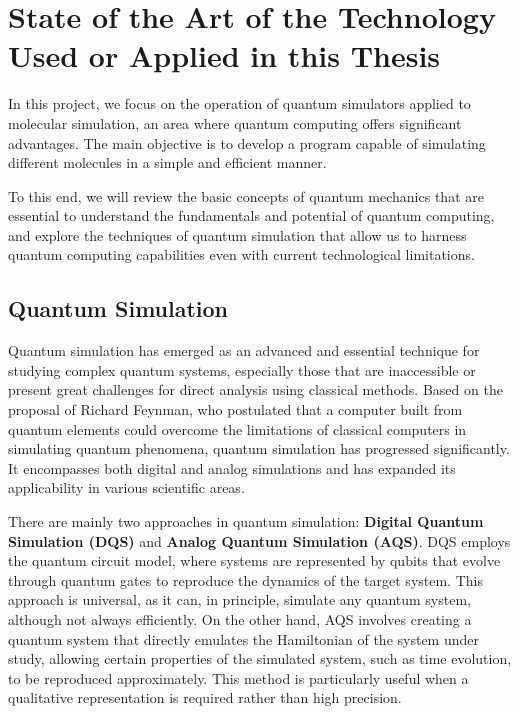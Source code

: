 \chapter[State of the Art]{State of the Art of the Technology Used or Applied in this Thesis}

In this project, we focus on the operation of quantum simulators applied to molecular simulation, an area where quantum computing offers significant advantages. The main objective is to develop a program capable of simulating different molecules in a simple and efficient manner.

To this end, we will review the basic concepts of quantum mechanics that are essential to understand the fundamentals and potential of quantum computing, and explore the techniques of quantum simulation that allow us to harness quantum computing capabilities even with current technological limitations.

\section{Quantum Simulation}

Quantum simulation has emerged as an advanced and essential technique for studying complex quantum systems, especially those that are inaccessible or present great challenges for direct analysis using classical methods. Based on the proposal of Richard Feynman, who postulated that a computer built from quantum elements could overcome the limitations of classical computers in simulating quantum phenomena, quantum simulation has progressed significantly. It encompasses both digital and analog simulations and has expanded its applicability in various scientific areas.

There are mainly two approaches in quantum simulation: \textbf{Digital Quantum Simulation (DQS)} and \textbf{Analog Quantum Simulation (AQS)}. DQS employs the quantum circuit model, where systems are represented by qubits that evolve through quantum gates to reproduce the dynamics of the target system. This approach is universal, as it can, in principle, simulate any quantum system, although not always efficiently. On the other hand, AQS involves creating a quantum system that directly emulates the Hamiltonian of the system under study, allowing certain properties of the simulated system, such as time evolution, to be reproduced approximately. This method is particularly useful when a qualitative representation is required rather than high precision.

